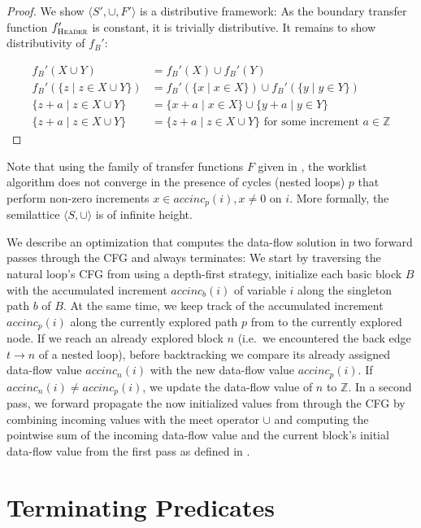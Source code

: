 \begin{proof}
    We show $\langle S', \cup, F' \rangle$ is a distributive framework: As the boundary transfer function $f'_{\textsc{Header}}$ is constant, it is trivially distributive. It remains to show distributivity of $f_B'$:

    \begin{align}
        f_B'(X \cup Y) &= f_B'(X) \cup f_B'(Y) \\
        f_B'(\{z \mid z \in X \cup Y\}) &= f_B'(\{x \mid x \in X\}) \cup f_B'(\{y \mid y \in Y\}) \\
        \{z + a \mid z \in X \cup Y\} &= \{x + a \mid x \in X\} \cup \{y + a \mid y \in Y\} \\
        \{z + a \mid z \in X \cup Y\} &= \{z + a \mid z \in X \cup Y\} \text{ for some increment } a \in \mathbb{Z}
    \end{align}
\end{proof}

Note that using the family of transfer functions $F$ given in , the worklist algorithm does not converge in the presence of cycles (nested loops) $p$ that perform non-zero increments $x \in accinc_p(i), x \ne 0$ on $i$. More formally, the semilattice $\langle S, \cup \rangle$ is of infinite height.

We describe an optimization that computes the data-flow solution in two forward passes through the CFG and always terminates: We start by traversing the natural loop's CFG from \entry{} using a depth-first strategy, initialize each basic block $B$ with the accumulated increment $accinc_b(i)$ of variable $i$ along the singleton path $b$ of $B$. At the same time, we keep track of the accumulated increment $accinc_p(i)$ along the currently explored path $p$ from \entry{} to the currently explored node. If we reach an already explored block $n$ (i.e.\ we encountered the back edge $t \rightarrow n$ of a nested loop), before backtracking we compare its already assigned data-flow value $accinc_n(i)$ with the new data-flow value $accinc_p(i)$. If $accinc_n(i) \ne accinc_p(i)$, we update the data-flow value of $n$ to $\mathbb{Z}$. In a second pass, we forward propagate the now initialized values from \entry{} through the CFG by combining incoming values with the meet operator $\cup$ and computing the pointwise sum of the incoming data-flow value and the current block's initial data-flow value from the first pass as defined in .

\section{Terminating Predicates}
\label{sec:term_pred}

